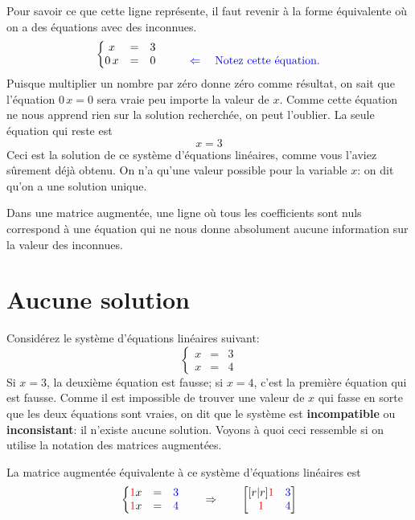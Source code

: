 Pour savoir ce que cette ligne représente, il faut revenir à la forme
équivalente où on a des équations avec des inconnues.
\[
\left\{
\begin{matrix}
x &=& 3\\
0\,x &=& 0 &\qquad {\color{blue}\Leftarrow\quad\mbox{Notez cette équation.}}
\end{matrix}
\right.
\]
Puisque multiplier un nombre par zéro donne zéro comme résultat, on sait que l'équation $0\,x=0$
sera vraie peu importe la valeur de $x$.
Comme cette équation ne nous apprend rien sur
la solution recherchée, on peut l'oublier.
La seule équation qui reste est
\[
x = 3
\]
Ceci est la solution de ce système d'équations
linéaires, comme vous l'aviez sûrement déjà obtenu. On n'a qu'une valeur possible pour
la variable $x$: on dit qu'on a une solution unique.

\begin{NotDef}
Dans une matrice augmentée, une ligne où tous les coefficients sont nuls
correspond à une équation qui ne nous donne absolument aucune information sur
la valeur des inconnues.
\end{NotDef}

\section{Aucune solution}

Considérez le système d'équations linéaires suivant:
\[
\left\{
\begin{matrix}
x &=& 3\\
x &=& 4
\end{matrix}
\right.
\]
Si $x=3$, la deuxième équation est fausse; si $x=4$, c'est la première équation qui est fausse.
Comme il est impossible de trouver une valeur
de $x$ qui fasse en sorte que les deux équations sont vraies, on dit que le système est \textbf{incompatible} ou \textbf{inconsistant}: il n'existe aucune solution. Voyons à quoi ceci
ressemble si on utilise la notation des
matrices augmentées.

La matrice augmentée équivalente à ce système d'équations linéaires est
\[
\left\{
\begin{matrix}
{\color{red}1}x &=& {\color{blue}3}\\
{\color{red}1}x &=& {\color{blue}4}
\end{matrix}
\right.
\qquad \Rightarrow\qquad
\begin{bmatrix}[r|r]
{\color{red}1} & {\color{blue}3}\\
{\color{red}1} & {\color{blue}4}
\end{bmatrix}
\]


